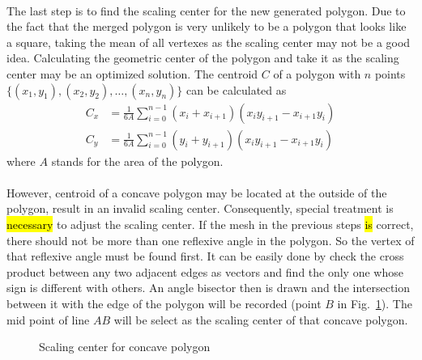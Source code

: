 \paragraph{}
The last step is to find the scaling center for the new generated polygon.
Due to the fact that the merged polygon is very unlikely to be a polygon that looks like a square, taking the mean of all vertexes as the scaling center may not be a good idea.
Calculating the geometric center of the polygon and take it as the scaling center may be an optimized solution.
The centroid $C$ of a polygon with $n$ points $\{(x_1,y_1),(x_2,y_2),\dots,(x_n,y_n)\}$ can be calculated as
\begin{equation}
    \begin{aligned}
        C_x &= \frac{1}{6A} \sum_{i=0}^{n-1}\left(
            x_i + x_{i+1}    
        \right) \left(
            x_i y_{i+1} - x_{i+1} y_i
        \right) \\
        C_y &= \frac{1}{6A} \sum_{i=0}^{n-1}\left(
            y_i + y_{i+1}    
        \right) \left(
            x_i y_{i+1} - x_{i+1} y_i
        \right)
    \end{aligned}
\end{equation}
where $A$ stands for the area of the polygon.

\paragraph{}
However, centroid of a concave polygon may be located at the outside of the polygon, result in an invalid scaling center.
Consequently, special treatment is \hl{necessary} to adjust the scaling center.
If the mesh in the previous steps \hl{is} correct, there should not be more than one reflexive angle in the polygon.
So the vertex of that reflexive angle must be found first.
It can be easily done by check the cross product between any two adjacent edges as vectors and find the only one whose sign is different with others.
An angle bisector then is drawn and the intersection between it with the edge of the polygon will be recorded (point $B$ in Fig.~\ref{adap_fig:mt_concave_sc}).
The mid point of line $AB$ will be select as the scaling center of that concave polygon.

\begin{figure}[!ht]
    \centering
    \caption[Scaling center for concave polygon]{Scaling center for concave polygon}
    \label{adap_fig:mt_concave_sc}
\end{figure}


